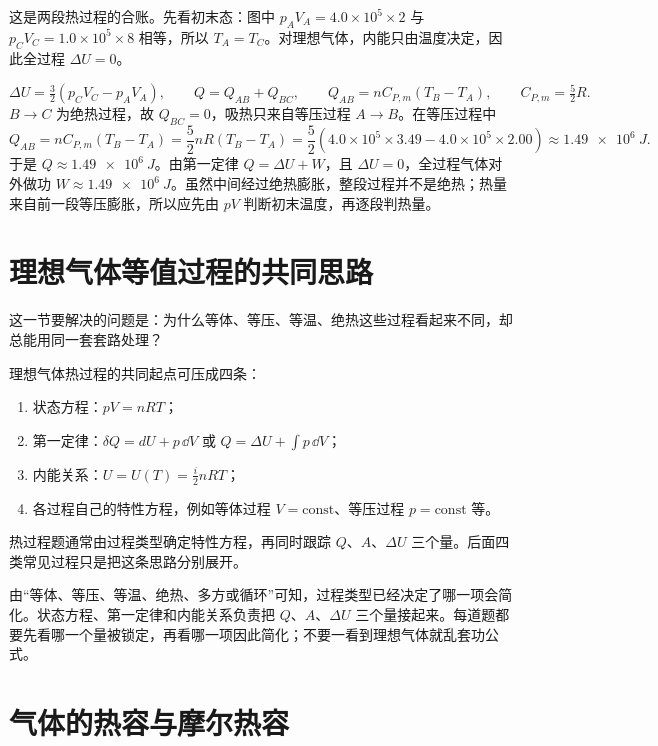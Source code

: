\documentclass[lang=cn,11pt]{elegantbook}
\newcommand{\bridge}[1]{\begin{note}#1\end{note}}
\begin{document}
\begin{solution}
这是两段热过程的合账。先看初末态：图中 \(p_AV_A=4.0\times10^5\times2\) 与 \(p_CV_C=1.0\times10^5\times8\) 相等，所以 \(T_A=T_C\)。对理想气体，内能只由温度决定，因此全过程 \(\Delta U=0\)。

 \(\Delta U=\frac32(p_CV_C-p_AV_A), \qquad Q=Q_{AB}+Q_{BC},\qquad Q_{AB}=nC_{P,m}(T_B-T_A),\qquad C_{P,m}=\frac52R.\) 
\(B\to C\) 为绝热过程，故 \(Q_{BC}=0\)，吸热只来自等压过程 \(A\to B\)。在等压过程中
\[
Q_{AB}
=nC_{P,m}(T_B-T_A)
=\frac52 nR(T_B-T_A)
=\frac52\left(4.0\times10^5\times3.49-4.0\times10^5\times2.00\right)
\approx \SI{1.49e6}{J}.
\]
于是 \(Q\approx\SI{1.49e6}{J}\)。由第一定律 \(Q=\Delta U+W\)，且 \(\Delta U=0\)，全过程气体对外做功 \(W\approx\SI{1.49e6}{J}\)。虽然中间经过绝热膨胀，整段过程并不是绝热；热量来自前一段等压膨胀，所以应先由 \(pV\) 判断初末温度，再逐段判热量。
\end{solution}

\section{理想气体等值过程的共同思路}

这一节要解决的问题是：为什么等体、等压、等温、绝热这些过程看起来不同，却总能用同一套套路处理？

理想气体热过程的共同起点可压成四条：
\begin{enumerate}
 \item 状态方程：\(pV=nRT\)；
 \item 第一定律：\(\delta Q=dU+p\,\dd V\) 或 \(Q=\Delta U+\int p\,\dd V\)；
 \item 内能关系：\(U=U(T)=\frac{i}{2}nRT\)；
 \item 各过程自己的特性方程，例如等体过程 \(V=\text{const}\)、等压过程 \(p=\text{const}\) 等。
\end{enumerate}

\bridge{热过程题通常由过程类型确定特性方程，再同时跟踪 \(Q\)、\(A\)、\(\Delta U\) 三个量。后面四类常见过程只是把这条思路分别展开。}

\begin{note}
 由“等体、等压、等温、绝热、多方或循环”可知，过程类型已经决定了哪一项会简化。状态方程、第一定律和内能关系负责把 \(Q\)、\(A\)、\(\Delta U\) 三个量接起来。每道题都要先看哪一个量被锁定，再看哪一项因此简化；不要一看到理想气体就乱套功公式。
\end{note}

\section{气体的热容与摩尔热容}
\end{document}
